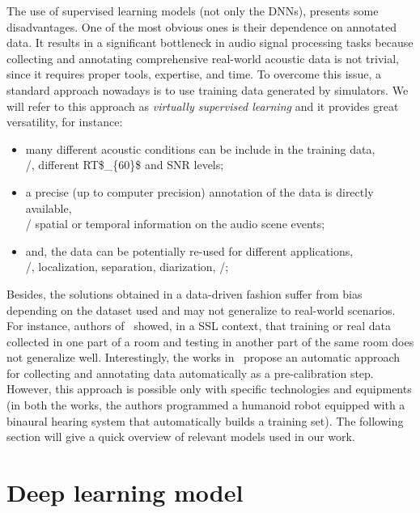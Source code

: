 \mynewline
The use of supervised learning models (not only the \acp{DNN}), presents some disadvantages.
One of the most obvious ones is their dependence on annotated data. It results in a significant bottleneck in audio signal processing tasks because collecting and annotating comprehensive real-world acoustic data is not trivial, since it requires proper tools, expertise, and time.
To overcome this issue, a standard approach nowadays is to use training data generated by simulators.
We will refer to this approach as \textit{virtually supervised learning} and it provides great versatility, for instance:
\begin{itemize}
    \item many different acoustic conditions can be include in the training data,\\\eg/, different \acf{RT$_{60}$} and \acf{SNR} levels;
    \item a precise (up to computer precision) annotation of the data is directly available,\\\eg/ spatial or temporal information on the audio scene events;
    \item and, the data can be potentially re-used for different applications,\\\eg/, localization, separation, diarization, \etc/;
\end{itemize}
Besides, the solutions obtained in a data-driven fashion suffer from bias depending on the dataset used and may not generalize to real-world scenarios.
For instance, authors of~ showed, in a \ac{SSL} context, that training or real data collected in one part of a room and testing in another part of the same room does not generalize well.
Interestingly, the works in~ propose an automatic approach for collecting and annotating data automatically as a pre-calibration step.
However, this approach is possible only with specific technologies and equipments (in both the works, the authors programmed a humanoid robot equipped with a binaural hearing system that automatically builds a training set).
The following section will give a quick overview of relevant models used in our work.

\section{Deep learning model}\label{sec:lantern:dnn}

